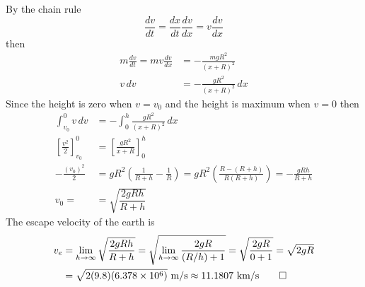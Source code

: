 \begin{solution}
    By the chain rule
    \[\frac{dv}{dt}=\frac{dx}{dt}\frac{dv}{dx}=v\frac{dv}{dx}\]
    then
    \begin{align*}
        m\frac{dv}{dt}=mv\frac{dv}{dx} &= -\frac{mgR^2}{(x+R)^2} \\
        v\,dv &= -\frac{gR^2}{(x+R)^2}\,dx
    \end{align*}
    Since the height is zero when \(v=v_0\) and the height is maximum when
    \(v=0\) then
    \begin{align*}
        \int_{v_0}^0 v\,dv &= -\int_0^h \frac{gR^2}{(x+R)^2}\,dx \\
        \left[\frac{v^2}{2}\right]_{v_0}^0
        &= \left[\frac{gR^2}{x+R}\right]_0^h \\
        -\frac{(v_0)^2}{2} &= gR^2\left(\frac{1}{R+h}-\frac{1}{R}\right)
        =gR^2\left(\frac{R-(R+h)}{R(R+h)}\right)=-\frac{gRh}{R+h} \\
        v_0= &= \sqrt{\dfrac{2gRh}{R+h}}
    \end{align*}
    The escape velocity of the earth is
    \begin{align*}
        v_e &= \lim_{h\to\infty}\sqrt{\dfrac{2gRh}{R+h}}
        =\sqrt{\lim_{h\to\infty}\frac{2gR}{(R/h)+1}}=\sqrt{\frac{2gR}{0+1}}
        =\sqrt{2gR} \\
        &=\sqrt{2(9.8)(6.378\times10^6)}\ \text{m/s}
        \approx 11.1807\ \text{km/s} \qedhere
    \end{align*}
\end{solution}